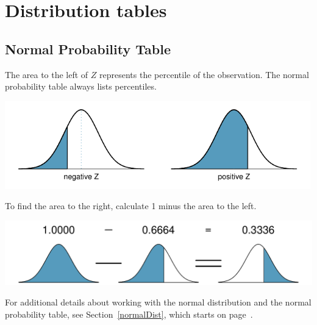\textPE{\ \pagebreak}

\chapter{Distribution tables}
\label{distributionTables}

\section{Normal Probability Table}
\label{normalProbabilityTable}

The area to the left of $Z$ represents the percentile of the observation. The normal probability table always lists percentiles.
\begin{center}
\includegraphics[height=1.5in]{extraTeX/appendix/figures/normalTails/normalTails}
\end{center}
To find the area to the right, calculate 1 minus the area to the left.\vspace{1mm}
\begin{center}
\includegraphics[height=1.1in]{extraTeX/appendix/figures/normalTails/subtractingArea/subtractingArea}\vspace{3mm}
\end{center}
For additional details about working with the normal distribution and the normal probability table, see Section~\ref{normalDist}, which starts on page~\pageref{normalDist}.

